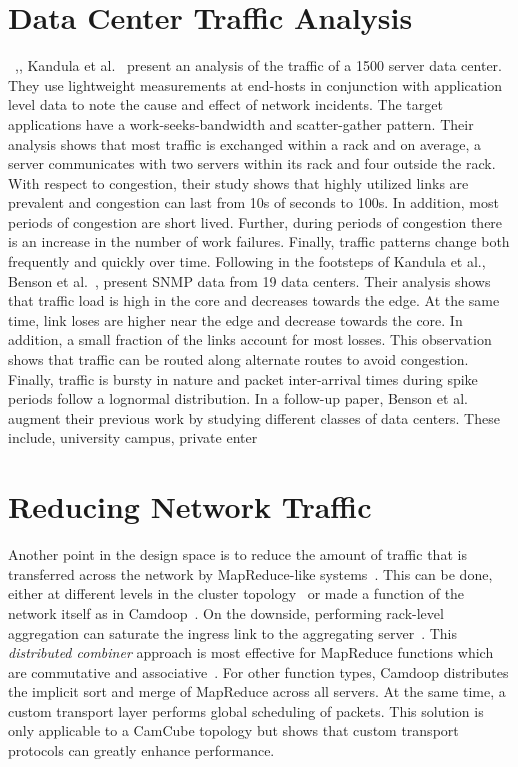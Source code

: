 \documentclass[a4paper,12pt,twoside,openright]{report}
\begin{document}
\section{Data Center Traffic Analysis}
~\cite{Benson:2010:NTC},,
Kandula et al.~\cite{Kandula:2009:NDC} present an analysis of the traffic of a
1500 server data center. They use lightweight measurements at end-hosts in
conjunction with application level data to note the cause and effect of network
incidents. The target applications have a work-seeks-bandwidth and
scatter-gather pattern. Their analysis shows that most traffic is exchanged
within a rack and on average, a server communicates with two servers within its
rack and four outside the rack. With respect to congestion, their study shows
that highly utilized links are prevalent and congestion can last from 10s of
seconds to 100s. In addition, most periods of congestion are short lived.
Further, during periods of congestion there is an increase in the number of work
failures. Finally, traffic patterns change both frequently and quickly over
time. Following in the footsteps of Kandula et al., Benson et
al.~\cite{Benson:2009:UDC}, present SNMP data from 19 data centers. Their
analysis shows that traffic load is high in the core and decreases towards the
edge. At the same time, link loses are higher near the edge and decrease towards
the core. In addition, a small fraction of the links account for most losses.
This observation shows that traffic can be routed along alternate routes to
avoid congestion. Finally, traffic is bursty in nature and packet inter-arrival
times during spike periods follow a lognormal distribution. In a follow-up
paper, Benson et al.~\cite{Benson:2010:NTC} augment their previous work by
studying different classes of data centers. These include, university campus,
private enter

\section{Reducing Network Traffic}
Another point in the design space is to reduce the amount of traffic that is
transferred across the network by MapReduce-like
systems~\cite{Costa:2012:CEI,Yu:2009:DAD}. This can be done, either at different
levels in the cluster topology~\cite{Yu:2009:DAD} or made a function of the
network itself as in Camdoop~\cite{Costa:2012:CEI}. On the downside, performing
rack-level aggregation can saturate the ingress link to the aggregating
server~\cite{Yu:2009:DAD}. This \emph{distributed combiner} approach is most
effective for MapReduce functions which are commutative and
associative~\cite{Dean:2004:MSD}. For other function types, Camdoop distributes
the implicit sort and merge of MapReduce across all servers. At the same time, a
custom transport layer performs global scheduling of packets. This solution is
only applicable to a CamCube topology but shows that custom transport protocols
can greatly enhance performance.
\end{document}
